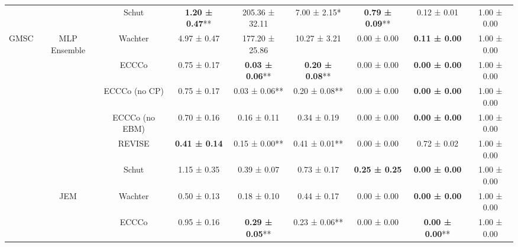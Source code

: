 \begin{table}
{\begin{tabular}[t]{ccccccccc}
 &  & Schut & \textbf{1.20 ± 0.47}** & 205.36 ± 32.11\hphantom{*}\hphantom{*} & 7.00 ± 2.15*\hphantom{*} & \textbf{0.79 ± 0.09}** & 0.12 ± 0.01\hphantom{*}\hphantom{*} & 1.00 ± 0.00\hphantom{*}\hphantom{*}\\

\multirow[t]{-16}{*}{\centering\arraybackslash GMSC} & \multirow[t]{-4}{*}{\centering\arraybackslash MLP Ensemble} & Wachter & 4.97 ± 0.47\hphantom{*}\hphantom{*} & 177.20 ± 25.86\hphantom{*}\hphantom{*} & 10.27 ± 3.21\hphantom{*}\hphantom{*} & 0.00 ± 0.00\hphantom{*}\hphantom{*} & \textbf{0.11 ± 0.00}\hphantom{*}\hphantom{*} & 1.00 ± 0.00\hphantom{*}\hphantom{*}\\
\cmidrule{1-9}
 &  & ECCCo & 0.75 ± 0.17\hphantom{*}\hphantom{*} & \textbf{0.03 ± 0.06}** & \textbf{0.20 ± 0.08}** & 0.00 ± 0.00\hphantom{*}\hphantom{*} & \textbf{0.00 ± 0.00}\hphantom{*}\hphantom{*} & 1.00 ± 0.00\hphantom{*}\hphantom{*}\\

 &  & ECCCo (no CP) & 0.75 ± 0.17\hphantom{*}\hphantom{*} & 0.03 ± 0.06** & 0.20 ± 0.08** & 0.00 ± 0.00\hphantom{*}\hphantom{*} & \textbf{0.00 ± 0.00}\hphantom{*}\hphantom{*} & 1.00 ± 0.00\hphantom{*}\hphantom{*}\\

 &  & ECCCo (no EBM) & 0.70 ± 0.16\hphantom{*}\hphantom{*} & 0.16 ± 0.11\hphantom{*}\hphantom{*} & 0.34 ± 0.19\hphantom{*}\hphantom{*} & 0.00 ± 0.00\hphantom{*}\hphantom{*} & \textbf{0.00 ± 0.00}\hphantom{*}\hphantom{*} & 1.00 ± 0.00\hphantom{*}\hphantom{*}\\

 &  & REVISE & \textbf{0.41 ± 0.14}\hphantom{*}\hphantom{*} & 0.15 ± 0.00** & 0.41 ± 0.01** & 0.00 ± 0.00\hphantom{*}\hphantom{*} & 0.72 ± 0.02\hphantom{*}\hphantom{*} & 1.00 ± 0.00\hphantom{*}\hphantom{*}\\

 &  & Schut & 1.15 ± 0.35\hphantom{*}\hphantom{*} & 0.39 ± 0.07\hphantom{*}\hphantom{*} & 0.73 ± 0.17\hphantom{*}\hphantom{*} & \textbf{0.25 ± 0.25}\hphantom{*}\hphantom{*} & \textbf{0.00 ± 0.00}\hphantom{*}\hphantom{*} & 1.00 ± 0.00\hphantom{*}\hphantom{*}\\

 & \multirow[t]{-6}{*}{\centering\arraybackslash JEM} & Wachter & 0.50 ± 0.13\hphantom{*}\hphantom{*} & 0.18 ± 0.10\hphantom{*}\hphantom{*} & 0.44 ± 0.17\hphantom{*}\hphantom{*} & 0.00 ± 0.00\hphantom{*}\hphantom{*} & \textbf{0.00 ± 0.00}\hphantom{*}\hphantom{*} & 1.00 ± 0.00\hphantom{*}\hphantom{*}\\
\cmidrule{2-9}
 &  & ECCCo & 0.95 ± 0.16\hphantom{*}\hphantom{*} & \textbf{0.29 ± 0.05}** & 0.23 ± 0.06** & 0.00 ± 0.00\hphantom{*}\hphantom{*} & \textbf{0.00 ± 0.00}** & 1.00 ± 0.00\hphantom{*}\hphantom{*}\\


\end{tabular}}
\end{table}

